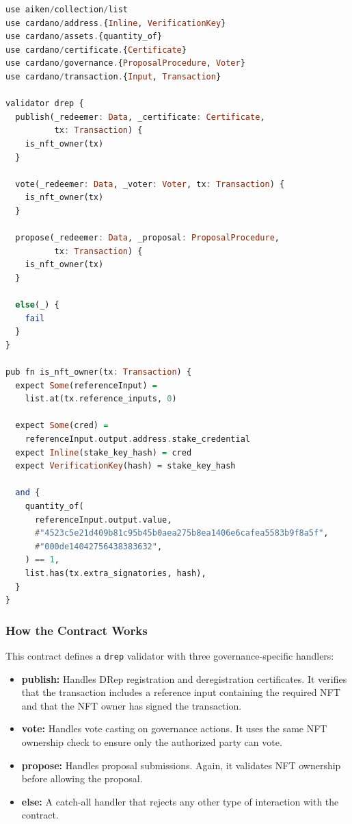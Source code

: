 \begin{lstlisting}[language=haskell, caption=DRep Smart Contract in Aiken]
use aiken/collection/list
use cardano/address.{Inline, VerificationKey}
use cardano/assets.{quantity_of}
use cardano/certificate.{Certificate}
use cardano/governance.{ProposalProcedure, Voter}
use cardano/transaction.{Input, Transaction}

validator drep {
  publish(_redeemer: Data, _certificate: Certificate,
          tx: Transaction) {
    is_nft_owner(tx)
  }

  vote(_redeemer: Data, _voter: Voter, tx: Transaction) {
    is_nft_owner(tx)
  }

  propose(_redeemer: Data, _proposal: ProposalProcedure,
          tx: Transaction) {
    is_nft_owner(tx)
  }

  else(_) {
    fail
  }
}

pub fn is_nft_owner(tx: Transaction) {
  expect Some(referenceInput) =
    list.at(tx.reference_inputs, 0)

  expect Some(cred) =
    referenceInput.output.address.stake_credential
  expect Inline(stake_key_hash) = cred
  expect VerificationKey(hash) = stake_key_hash

  and {
    quantity_of(
      referenceInput.output.value,
      #"4523c5e21d409b81c95b45b0aea275b8ea1406e6cafea5583b9f8a5f",
      #"000de14042756438383632",
    ) == 1,
    list.has(tx.extra_signatories, hash),
  }
}
\end{lstlisting}

\subsubsection{How the Contract Works}

This contract defines a \texttt{drep} validator with three governance-specific handlers:

\begin{itemize}
    \item \textbf{publish:} Handles DRep registration and deregistration certificates. It verifies that the transaction includes a reference input containing the required NFT and that the NFT owner has signed the transaction.
    \item \textbf{vote:} Handles vote casting on governance actions. It uses the same NFT ownership check to ensure only the authorized party can vote.
    \item \textbf{propose:} Handles proposal submissions. Again, it validates NFT ownership before allowing the proposal.
    \item \textbf{else:} A catch-all handler that rejects any other type of interaction with the contract.
\end{itemize}


